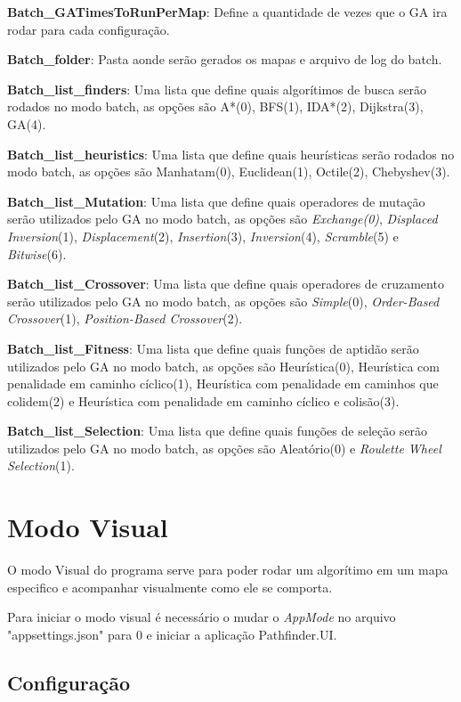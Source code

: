  \textbf{Batch\_GATimesToRunPerMap}: Define a quantidade de vezes que o GA ira rodar para cada configuração.
 
 \textbf{Batch\_folder}: Pasta aonde serão gerados os mapas e arquivo de log do batch.
 
 \textbf{Batch\_list\_finders}: Uma lista que define quais algorítimos de busca serão rodados no modo batch, as opções são  A\**(0), BFS(1), IDA\**(2), Dijkstra(3), GA(4).
 
 \textbf{Batch\_list\_heuristics}: Uma lista que define quais heurísticas serão rodados no modo batch, as opções são Manhatam(0), Euclidean(1), Octile(2), Chebyshev(3).
 
 \textbf{Batch\_list\_Mutation}: Uma lista que define quais operadores de mutação serão utilizados pelo GA no modo batch, as opções são  \textit{Exchange(0)}, \textit{Displaced Inversion}(1), \textit{Displacement}(2), \textit{Insertion}(3), \textit{Inversion}(4), \textit{Scramble}(5) e \textit{Bitwise}(6).
 
 \textbf{Batch\_list\_Crossover}: Uma lista que define quais operadores de cruzamento serão utilizados pelo GA no modo batch, as opções são  \textit{Simple}(0), \textit{Order-Based Crossover}(1), \textit{Position-Based Crossover}(2).
 
 \textbf{Batch\_list\_Fitness}: Uma lista que define quais funções de aptidão serão utilizados pelo GA no modo batch, as opções são Heurística(0), Heurística com penalidade em caminho cíclico(1), Heurística com penalidade em caminhos que colidem(2) e Heurística com penalidade em caminho cíclico e colisão(3).
 
 \textbf{Batch\_list\_Selection}: Uma lista que define quais funções de seleção serão utilizados pelo GA no modo batch, as opções são  Aleatório(0) e \textit{Roulette Wheel Selection}(1).
 
 \section{Modo Visual}
 
 O modo Visual do programa serve para poder rodar um algorítimo em um mapa especifico e acompanhar visualmente como ele se comporta.
 
 Para iniciar o modo visual é necessário o mudar o \textit{AppMode} no arquivo "appsettings.json" para 0 e iniciar a aplicação Pathfinder.UI.
 
 
 \subsection{Configuração}
 
